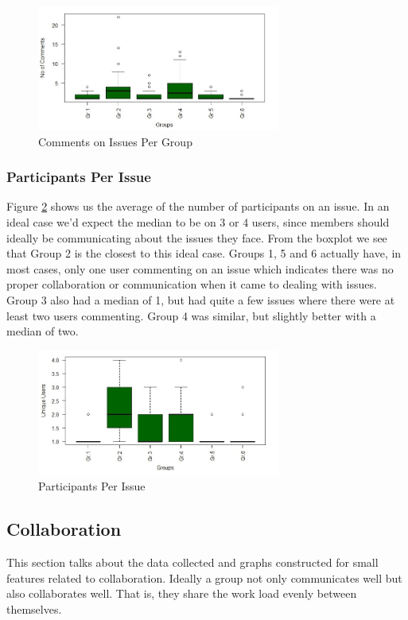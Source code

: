 \documentclass{acm_proc_article-sp}
\begin{document}
\begin{figure}[h]
\centering
\includegraphics[width=8cm]{img/numcomments}
\caption{Comments on Issues Per Group}
\label{fig:numcomments}
\end{figure}

\subsubsection{Participants Per Issue}

Figure \ref{fig:issueComment} shows us the average of the number of participants on an issue. In an ideal case we'd expect the median to be on 3 or 4 users, since members should ideally be communicating about the issues they face. From the boxplot we see that Group 2 is the closest to this ideal case. Groups 1, 5 and 6 actually have, in most cases, only one user commenting on an issue which indicates there was no proper collaboration or communication when it came to dealing with issues. Group 3 also had a median of 1, but had quite a few issues where there were at least two users commenting. Group 4 was similar, but slightly better with a median of two.

\begin{figure}[h]
\centering
\includegraphics[width=8cm]{img/issueComment}
\caption{Participants Per Issue}
\label{fig:issueComment}
\end{figure}

\subsection{Collaboration}

This section talks about the data collected and graphs constructed for small features related to collaboration. Ideally a group not only communicates well but also collaborates well. That is, they share the work load evenly between themselves.
\end{document}
